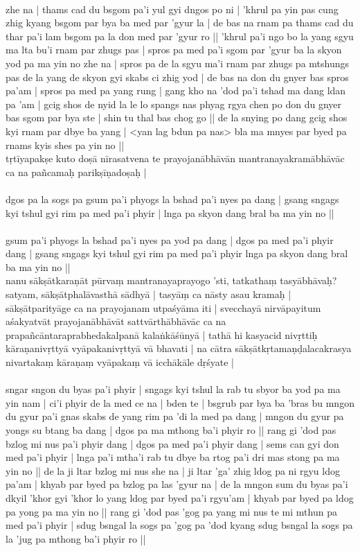 \documentclass[12pt]{article}
\begin{document}
\textbf{\TVB}\\
zhe na | thams cad du bsgom pa'i yul gyi dngos po ni | 'khrul pa yin pas cung zhig kyang bsgom par bya ba med par 'gyur la | de bas na rnam pa thams cad du thar pa'i lam bsgom pa la don med par 'gyur ro || 'khrul pa'i ngo bo la yang sgyu ma lta bu'i rnam par zhugs pas | spros pa med pa'i sgom par 'gyur ba la skyon yod pa ma yin no zhe na | spros pa de la sgyu ma'i rnam par zhugs pa mtshungs pas de la yang de skyon gyi skabs ci zhig yod | de bas na don du gnyer bas spros pa'am | spros pa med pa yang rung | gang kho na 'dod pa'i tshad ma dang ldan pa 'am | gcig shos de nyid la le lo spangs nas phyag rgya chen po don du gnyer bas sgom par bya ste | shin tu thal bas chog go || de la snying po dang gcig shos kyi rnam par dbye ba yang | <yan lag bdun pa nas> bla ma mnyes par byed pa rnams kyis shes pa yin no || \\

tṛtīyapakṣe kuto doṣā nīrasatvena te prayojanābhāvān mantranayakramābhāvāc ca na pañcamaḥ parikṣīṇadoṣaḥ |\\

\textbf{\TVA}\\
dgos pa la sogs pa gsum pa'i phyogs la bshad pa'i nyes pa dang | gsang sngags kyi tshul gyi rim pa med pa'i phyir | lnga pa skyon dang bral ba ma yin no || \\

\textbf{\TVB}\\
gsum pa'i phyogs la bshad pa'i nyes pa yod pa dang | dgos pa med pa'i phyir dang | gsang sngags kyi tshul gyi rim pa med pa'i phyir lnga pa skyon dang bral ba ma yin no || \\

nanu sākṣātkaraṇāt pūrvaṃ mantranayaprayogo 'sti, tatkathaṃ tasyābhāvaḥ? satyam, sākṣātphalāvasthā sādhyā | tasyāṃ ca nāsty asau kramaḥ | sākṣātparityāge ca na prayojanam utpaśyāma iti | svecchayā nirvāpayitum aśakyatvāt prayojanābhāvāt sattvārthābhāvāc ca na prapañcāntaraprabhedakalpanā kalaṅkāśūnyā | tathā hi kasyacid nivṛttiḥ kāraṇanivṛttyā vyāpakanivṛttyā vā bhavati | na cātra sākṣātkṛtamaṇḍalacakrasya nivartakaṃ kāraṇaṃ vyāpakaṃ vā icchākāle dṛśyate |\\

\textbf{\TVA}\\
sngar sngon du byas pa'i phyir | sngags kyi tshul la rab tu sbyor ba yod pa ma yin nam | ci'i phyir de la med ce na | bden te | bsgrub par bya ba 'bras bu mngon du gyur pa'i gnas skabs de yang rim pa 'di la med pa dang | mngon du gyur pa yongs su btang ba dang | dgos pa ma mthong ba'i phyir ro || rang gi 'dod pas bzlog mi nus pa'i phyir dang | dgos pa med pa'i phyir dang | sems can gyi don med pa'i phyir | lnga pa'i mtha'i rab tu dbye ba rtog pa'i dri mas stong pa ma yin no || de la ji ltar bzlog mi nus she na | ji ltar 'ga' zhig ldog pa ni rgyu ldog pa'am | khyab par byed pa bzlog pa las 'gyur na | de la mngon sum du byas pa'i dkyil 'khor gyi 'khor lo yang ldog par byed pa'i rgyu'am | khyab par byed pa ldog pa yong pa ma yin no || rang gi 'dod pas 'gog pa yang mi nus te mi mthun pa med pa'i phyir | sdug bsngal la sogs pa 'gog pa 'dod kyang sdug bsngal la sogs pa la 'jug pa mthong ba'i phyir ro || \\
\end{document}
